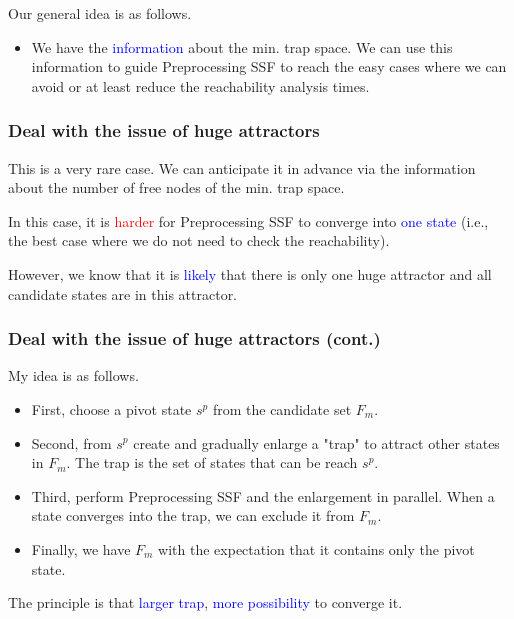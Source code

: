 \documentclass{beamer}              %
\newcommand{\blue}[1]{\textcolor{blue}{#1}}
\newcommand{\red}[1]{\textcolor{red}{#1}}
\begin{document}
\begin{frame}
{\hspace{0.1cm}

Our general idea is as follows.

\begin{itemize}
  \item We have the \blue{information} about the min. trap space. We can use this information to guide Preprocessing SSF to reach the easy cases where we can avoid or at least reduce the reachability analysis times.
\end{itemize}
}

\end{frame}

\begin{frame}
\frametitle{Deal with the issue of huge attractors}

This is a very rare case.
We can anticipate it in advance via the information about the number of free nodes of the min. trap space.

\hspace{0.1cm}

In this case, it is \red{harder} for Preprocessing SSF to converge into \blue{one state} (i.e., the best case where we do not need to check the reachability).

\hspace{0.1cm}

However, we know that it is \blue{likely} that there is only one huge attractor and all candidate states are in this attractor.

\end{frame}

\begin{frame}
\frametitle{Deal with the issue of huge attractors (cont.)}

My idea is as follows.
\begin{itemize}
  \item First, choose a pivot state \(s^{p}\) from the candidate set \(F_m\).
  \item Second, from \(s^{p}\) create and gradually enlarge a "trap" to attract other states in \(F_m\). The trap is the set of states that can be reach \(s^{p}\).
  \item Third, perform Preprocessing SSF and the enlargement in parallel. When a state converges into the trap, we can exclude it from \(F_m\).
  \item Finally, we have \(F_m\) with the expectation that it contains only the pivot state.
\end{itemize}

\hspace{0.1cm}

The principle is that \blue{larger trap}, \blue{more possibility} to converge it.

\end{frame}
\end{document}
